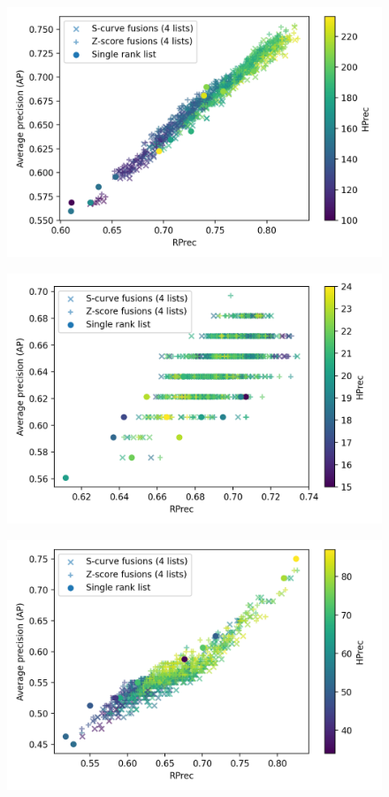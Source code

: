 \begin{figure}
  \includegraphics[width=\linewidth]{img/fusion_st_jean.png}
  \caption{}
  \label{fig:fusion_st_jean}
\end{figure}
\begin{figure}
  \includegraphics[width=\linewidth]{img/fusion_brunet.png}
  \caption{}
  \label{fig:fusion_brunet}
\end{figure}
\begin{figure}
  \includegraphics[width=\linewidth]{img/fusion_oxquarry.png}
  \caption{}
  \label{fig:fusion_oxquarry}
\end{figure}

